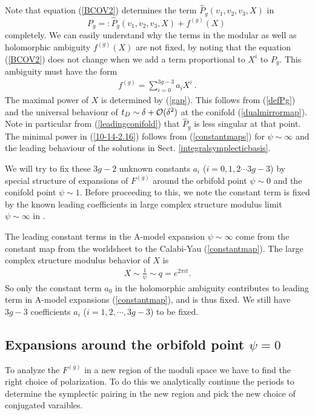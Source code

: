 \documentclass[12pt]{article}
\begin{document}
Note that equation (\ref{BCOV2}) determines the term
$\hat  P_g(v_1,v_2,v_3,X)$ in
\begin{equation}
P_g=:\hat P_g(v_1,v_2,v_3,X) + f^{(g)}(X)\
\label{fgdefinition}
\end{equation}
completely. We can easily understand why the terms in the modular
as well as holomorphic ambiguity $f^{(g)}(X)$ are not fixed, by
noting that the equation (\ref{BCOV2}) does not change when we add
a term proportional to $X^i$ to $P_g$. This ambiguity must have
the form~\cite{Katz:1999,Yamaguchi}
\begin{eqnarray} \label{10-14-2.16}
f^{(g)}=\sum_{i=0}^{3g-3}a_iX^i\ .
\end{eqnarray}
The maximal power of $X$ is determined by (\ref{gap}). This
follows from (\ref{defPg}) and the universal behaviour of $t_D\sim
\delta+ {\cal O}(\delta^2)$ at the conifold (\ref{dualmirrormap}).
Note in particular from (\ref{leadingconifold}) that $\hat  P_g$
is less singular at that point. The minimal power in
(\ref{10-14-2.16}) follows from (\ref{constantmaps}) for $\psi
\sim \infty$ and the leading behaviour of the solutions in Sect.
\ref{integralsymplecticbasis}.

We will try to fix these $3g-2$ unknown constants $a_i$
($i=0,1,2\cdots 3g-3$) by special structure of expansions of
$F^{(g)}$ around the orbifold point $\psi\sim 0$ and the conifold
point $\psi\sim 1$. Before proceeding to this, we note the
constant term is fixed by the known leading coefficients in large
complex structure modulus limit $\psi\sim \infty$ in
\cite{Marino:1998, GVII, FP}.

The leading constant terms in the A-model expansion $\psi\sim
\infty$ come from the constant map from the worldsheet to the
Calabi-Yau (\ref{constantmap}). The large complex structure
modulus behavior of $X$ is
\begin{eqnarray}
X\sim \frac{1}{\psi}\sim q=e^{2\pi it}.
\end{eqnarray}
So only the constant term $a_0$ in the holomorphic ambiguity
contributes to leading term in A-model expansions
(\ref{constantmap}), and is thus fixed. We still have $3g-3$
coefficients $a_i$ ($i=1,2,\cdots, 3g-3$) to be fixed.



\subsection{Expansions around the orbifold point $\psi=0$}
\label{quinticorbifold}
To analyze the $F^{(g)}$ in a new region of the 
moduli space we have to find the right choice of 
polarization. To do this we analytically 
continue the periods to determine the symplectic 
pairing in the new region and pick the new 
choice of conjugated varaibles.      
\end{document}

